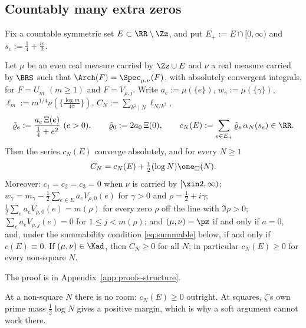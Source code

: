 \subsection{Countably many extra zeros}\label{ssec:Gfin}

Fix a countable symmetric set $E\subset\RR\setminus\Zz$, and put $E_+:=E\cap[0,\infty)$ and $s_e:=\frac14+\frac{ie}2$.

\begin{lemma}\label{lem:structure}
Let $\mu$ be an even real measure carried by $\Zz\cup E$ and $\nu$ a real measure carried by $\BRS$ such that
$\Arch(F)=\Spec_{\mu,\nu}(F)$, with absolutely convergent integrals, for $F=U_m$ $(m\ge1)$ and $F=V_{\rho,j}$. Write $a_e:=\mu(\{e\})$, $w_\gamma:=\mu(\{\gamma\})$,
$\ell_m:=m^{1/4}\nu(\{\frac{\log m}{4\pi}\})$, $C_N:=\sum_{k^2\mid N}\ell_{N/k^2}$,
\[
\tilde\varrho_e:=\frac{a_e\,\Xi(e)}{\frac14+e^2}\ (e>0),\qquad \tilde\varrho_0:=2a_0\,\Xi(0),\qquad c_N(E):=\sum_{e\in E_+}\tilde\varrho_e\,\alpha_N(s_e)\in\RR .
\]
Then the series $c_N(E)$ converge absolutely, and for every $N\ge1$
\begin{equation}\label{eq:CN}
C_N=c_N(E)+\tfrac12(\log N)\one_\square(N).
\end{equation}
Moreover: $c_1=c_2=c_3=0$ when $\nu$ is carried by $[\xin2,\infty)$; $w_\gamma=m_\gamma-\frac12\sum_{e\in E}a_eV_{\rho,0}(e)$
for $\gamma>0$ and $\rho=\frac12+i\gamma$; $\frac12\sum_ea_eV_{\rho,0}(e)=m(\rho)$ for every zero $\rho$ off the line with $\Im\rho>0$;
$\sum_ea_eV_{\rho,j}(e)=0$ for $1\le j<m(\rho)$; and $(\mu,\nu)=\pz$ if and only if $a=0$, and, under the summability condition
\eqref{eq:summable} below, if and only if $c(E)\equiv0$. If $(\mu,\nu)\in\Kad$, then $C_N\ge0$ for all $N$; in particular $c_N(E)\ge0$ for
every non-square $N$.
\end{lemma}

The proof is in Appendix~\ref{app:proofs-structure}.

At a non-square $N$ there is no room: $c_N(E)\ge0$ outright. At squares, $\zeta$'s own prime mass $\frac12\log N$ gives a positive
margin, which is why a soft argument cannot work there.

